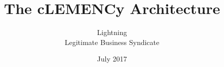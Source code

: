 \documentclass{book}
\title{The cLEMENCy Architecture}
\date{July 2017}
\author{Lightning\\ Legitimate Business Syndicate}
\begin{document}
\frontmatter
\begin{titlepage}
  \maketitle
  \end{titlepage}

\tableofcontents
\newpage
\listoftables
\mainmatter


\end{document}
